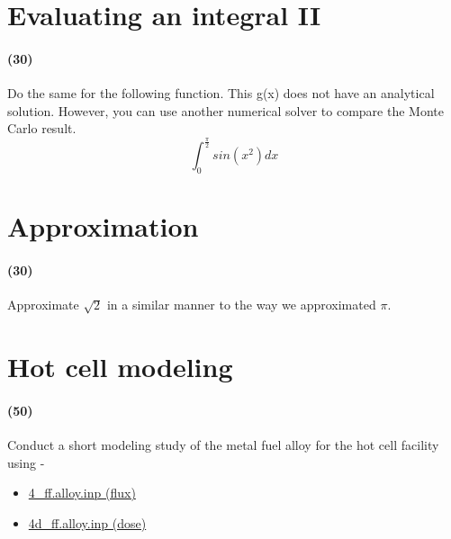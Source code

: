 \documentclass[11pt,a4paper]{article}
\begin{document}
\newpage

\section{Evaluating an integral II}
\paragraph*{(30)}
Do the same for the following function. This g(x) does not have an analytical solution. However, you can use another numerical solver to compare the Monte Carlo result.
\begin{equation}
    \int_0^{\frac{\pi}{2}}sin(x^2)dx
\end{equation}





\newpage

\section{Approximation}
\paragraph*{(30)}
Approximate $\sqrt{2}$ in a similar manner to the way we approximated $\pi$.





\newpage

\section{Hot cell modeling}
\paragraph*{(50)}
Conduct a short modeling study of the metal fuel alloy for the hot cell facility using - 
\begin{itemize}[leftmargin=*,topsep=0pt]
    \item\href{https://github.com/TheDoctorRAB/mcnpx.decks/blob/master/neutron.flux/input/4_ff.alloy.inp}{4\_ff.alloy.inp (flux)}
    \item\href{https://github.com/TheDoctorRAB/mcnpx.decks/blob/master/neutron.flux/input/4d_ff.alloy.inp}{4d\_ff.alloy.inp (dose)}
\end{itemize}

\vspace{\baselineskip}
\end{document}

